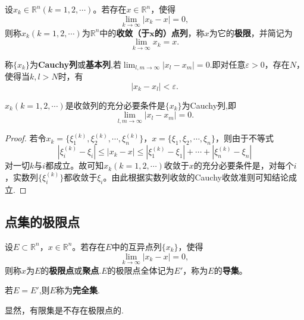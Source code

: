 \documentclass[../../main.tex]{subfiles}%
\begin{document}
\begin{definition}
  设\(x_k\in\mathbb{R}^n(k = 1,2,\cdots)\)。若存在\(x\in\mathbb{R}^n\)，使得
\[\lim_{k\rightarrow\infty}|x_k - x| = 0,\]
则称\(x_k(k = 1,2,\cdots)\)为\(\mathbb{R}^n\)中的\textbf{收敛（于\(\boldsymbol{x}\)的）点列}，称\(x\)为它的\textbf{极限}，并简记为
\[\lim_{k\rightarrow\infty}x_k = x.\]
\end{definition}

\begin{definition}[Cauchy列]\label{definition:Cauchy列}
  称\(\{x_k\}\)为\textbf{Cauchy列}或\textbf{基本列},若$\lim_{l,m\rightarrow\infty}|x_l - x_m| = 0$.即对任意\(\varepsilon>0\)，存在\(N\)，使得当\(k,l>N\)时，有
\[|x_k - x_l|<\varepsilon.\]
\end{definition}

\begin{theorem}
  \(x_k(k = 1,2,\cdots)\)是收敛列的充分必要条件是\(\{x_k\}\)为Cauchy列,即
\[\lim_{l,m\rightarrow\infty}|x_l - x_m| = 0.\]
\end{theorem}
\begin{proof}

  若令\(x_k=\{\xi_1^{(k)},\xi_2^{(k)},\cdots,\xi_n^{(k)}\}\)，\(x = \{\xi_1,\xi_2,\cdots,\xi_n\}\)，则由于不等式
\[|\xi_i^{(k)} - \xi_i|\leqslant|x_k - x|\leqslant|\xi_1^{(k)} - \xi_1|+\cdots+|\xi_n^{(k)} - \xi_n|\]
对一切\(k\)与\(i\)都成立。故可知\(x_k(k = 1,2,\cdots)\)收敛于\(x\)的充分必要条件是，对每个\(i\)，实数列\(\{\xi_i^{(k)}\}\)都收敛于\(\xi_i\)。由此根据实数列收敛的Cauchy收敛准则可知结论成立.

\end{proof}

\subsection{点集的极限点}

\begin{definition}\label{definition:极限点、导集与完全集}
设\(E\subset\mathbb{R}^n\)，\(x\in\mathbb{R}^n\)。若存在\(E\)中的互异点列\(\{x_k\}\)，使得
\[\lim_{k\rightarrow\infty}|x_k - x| = 0,\]
则称\(x\)为\(E\)的\textbf{极限点}或\textbf{聚点}.\(E\)的极限点全体记为\(E'\)，称为\(E\)的\textbf{导集}。

若$E = E'$,则$E$称为\textbf{完全集}.
\end{definition}
\begin{note}
显然，有限集是不存在极限点的.
\end{note}
\end{document}
